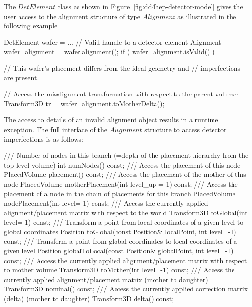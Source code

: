 \documentclass[10pt,a4paper]{article}
\begin{document}
\noindent
The $DetElement$ class as shown in Figure~\ref{fig:dd4hep-detector-model}
gives the user access to the alignment structure of type $Alignment$ as 
illustrated in the following example:
\begin{code}
    DetElement wafer = ... // Valid handle to a detector element
    Alignment  wafer_alignment = wafer.alignment();
    if ( wafer_alignment.isValid() )  {
        // This wafer's placement differs from the ideal geometry and 
        // imperfections are present.
        
        // Access the misalignment transformation with respect to the parent volume:
        Transform3D tr = wafer_alignment.toMotherDelta();
    }
\end{code}
The access to details of an invalid alignment object results in a runtime 
exception. The full interface of the $Alignment$ structure to access detector imperfections
is as follows:
\begin{code}
      /// Number of nodes in this branch (=depth of the placement hierarchy from the top level volume)
      int numNodes() const;
      /// Access the placement of this node
      PlacedVolume placement()   const;
      /// Access the placement of the mother of this node
      PlacedVolume motherPlacement(int level_up = 1)   const;
      /// Access the placement of a node in the chain of placements for this branch
      PlacedVolume nodePlacement(int level=-1)   const;
      /// Access the currently applied alignment/placement matrix with respect to the world
      Transform3D toGlobal(int level=-1) const;
      /// Transform a point from local coordinates of a given level to global coordinates
      Position toGlobal(const Position& localPoint, int level=-1) const;
      /// Transform a point from global coordinates to local coordinates of a given level
      Position globalToLocal(const Position& globalPoint, int level=-1) const;
      /// Access the currently applied alignment/placement matrix with respect to mother volume
      Transform3D toMother(int level=-1) const;
      /// Access the currently applied alignment/placement matrix (mother to daughter)
      Transform3D nominal() const;
      /// Access the currently applied correction matrix (delta) (mother to daughter)
      Transform3D delta() const;
\end{code}
\end{document}
